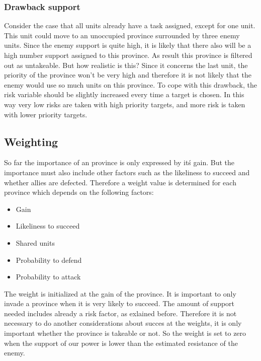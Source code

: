 \documentclass[a4paper]{article} %
\begin{document}
\subsubsection{Drawback support}
Consider the case that all units already have a task assigned, except for one unit. This unit could move to an unoccupied province surrounded by three enemy units. Since the enemy support is quite high, it is likely that there also will be a high number support assigned to this province. As result this province is filtered out as untakeable. But how realistic is this? Since it concerns the last unit, the priority of the province won't be very high and therefore it is not likely that the enemy would use so much units on this province. To cope with this drawback, the risk variable should be slightly increased every time a target is chosen. In this way very low risks are taken with high priority targets, and more risk is taken with lower priority targets. 

\subsection{Weighting}
So far the importance of an province is only expressed by it\'s gain. But the importance must also include other factors such as the likeliness to succeed and whether allies are defected. Therefore a weight value is determined for each province which depends on the following factors:

\begin{itemize}
\item Gain
\item Likeliness to succeed
\item Shared units
\item Probability to defend
\item Probability to attack
\end{itemize}

The weight is initialized at the gain of the province. It is important to only invade a province when it is very likely to succeed. The amount of support needed includes already a risk factor, as exlained before. Therefore it is not necessary to do another considerations about succes at the weights, it is only important whether the province is takeable or not. So the weight is set to zero when the support of our power is lower than the estimated resistance of the enemy.
\end{document}
